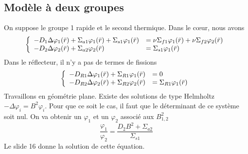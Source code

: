 \subsection{Modèle à deux groupes}
On suppose le groupe 1 rapide et le second thermique. Dans le cœur, nous avons
\begin{equation}
\left\{\begin{array}{ll}
\displaystyle - {D_1}\Delta {\varphi _1}(\bar r) + {\Sigma _{a1}}{\varphi _1}(\bar r) + {\Sigma _{s1}}{\varphi _1}(\bar r) &\displaystyle= \nu {\Sigma _{f1}}{\varphi _1}(\bar r) + \nu {\Sigma _{f2}}{\varphi _2}(\bar r)\\
\displaystyle- {D_2}\Delta {\varphi _2}(\bar r) + {\Sigma _{a2}}{\varphi _2}(\bar r) &\displaystyle= {\Sigma _{s1}}{\varphi _1}(\bar r)
\end{array}\right.
\end{equation}
Dans le réflecteur, il n'y a pas de termes de fissions
\begin{equation}
\left\{\begin{array}{ll}
\displaystyle- {D_{R1}}\Delta {\varphi _1}(\bar r) + {\Sigma _{R1}}{\varphi _1}(\bar r) &= 0\\
\displaystyle- {D_{R2}}\Delta {\varphi _2}(\bar r) + {\Sigma _{R2}}{\varphi _2}(\bar r) &\displaystyle= {\Sigma _{R1}}{\varphi _1}(\bar r)
\end{array}\right. 
\end{equation}
Travaillons en géométrie plane. Existe des solutions de type Helmholtz $- \Delta {\varphi _i} = {B^2}{\varphi _i}$. Pour que ce soit le cas, il faut que le déterminant de ce système soit nul. On va 
obtenir un $\varphi_1$ et un $\varphi_2$ associé aux $B_{1,2}^2$
\begin{equation}
\frac{{{\varphi _1}}}{{{\varphi _2}}} = \frac{{{D_2}{B^2} + {\Sigma _{a2}}}}{{{\Sigma _{s1}}}}
\end{equation}
Le slide 16 donne la solution de cette équation.\\


